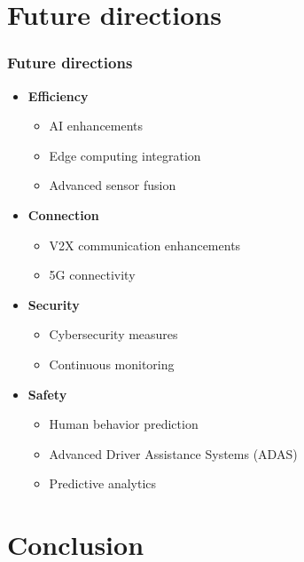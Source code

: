 \documentclass[xcolor=dvipsnames]{beamer}
\begin{document}

\section{Future directions}

\begin{frame}[fragile=singleslide]\frametitle{\bf{Future directions}}
\begin{itemize}

\item {\textbf{Efficiency}}
         \begin{itemize}
	\item AI enhancements
	\item Edge computing integration
         \item Advanced sensor fusion
	\end{itemize}
\item {\textbf{Connection}}
         \begin{itemize}
	\item V2X communication enhancements
         \item 5G connectivity
	\end{itemize}
\item {\textbf{Security}}
         \begin{itemize}
	\item Cybersecurity measures
         \item Continuous monitoring
	\end{itemize}
\item {\textbf{Safety}}
         \begin{itemize}
	\item Human behavior prediction
         \item Advanced Driver Assistance Systems (ADAS) 
         \item Predictive analytics
	\end{itemize}
\end{itemize}

\end{frame}

\section*{Conclusion}
\end{document}
